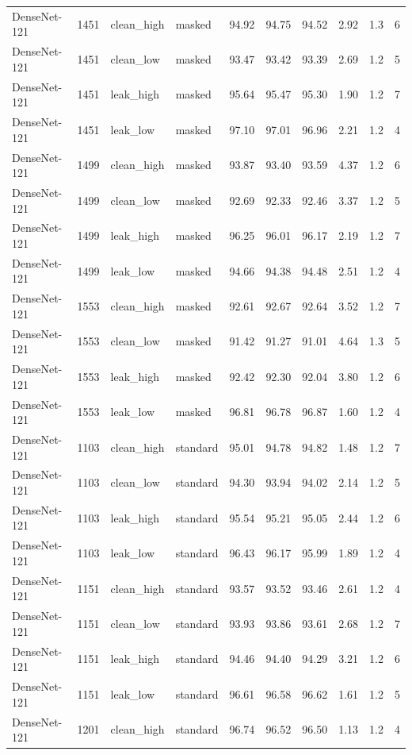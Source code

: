 {\begin{longtable}{lrllrrrrrr}
DenseNet-121 & 1451 & clean\_high & masked & 94.92 & 94.75 & 94.52 & 2.92 & 1.3 & 6 \\
DenseNet-121 & 1451 & clean\_low & masked & 93.47 & 93.42 & 93.39 & 2.69 & 1.2 & 5 \\
DenseNet-121 & 1451 & leak\_high & masked & 95.64 & 95.47 & 95.30 & 1.90 & 1.2 & 7 \\
DenseNet-121 & 1451 & leak\_low & masked & 97.10 & 97.01 & 96.96 & 2.21 & 1.2 & 4 \\
DenseNet-121 & 1499 & clean\_high & masked & 93.87 & 93.40 & 93.59 & 4.37 & 1.2 & 6 \\
DenseNet-121 & 1499 & clean\_low & masked & 92.69 & 92.33 & 92.46 & 3.37 & 1.2 & 5 \\
DenseNet-121 & 1499 & leak\_high & masked & 96.25 & 96.01 & 96.17 & 2.19 & 1.2 & 7 \\
DenseNet-121 & 1499 & leak\_low & masked & 94.66 & 94.38 & 94.48 & 2.51 & 1.2 & 4 \\
DenseNet-121 & 1553 & clean\_high & masked & 92.61 & 92.67 & 92.64 & 3.52 & 1.2 & 7 \\
DenseNet-121 & 1553 & clean\_low & masked & 91.42 & 91.27 & 91.01 & 4.64 & 1.3 & 5 \\
DenseNet-121 & 1553 & leak\_high & masked & 92.42 & 92.30 & 92.04 & 3.80 & 1.2 & 6 \\
DenseNet-121 & 1553 & leak\_low & masked & 96.81 & 96.78 & 96.87 & 1.60 & 1.2 & 4 \\
DenseNet-121 & 1103 & clean\_high & standard & 95.01 & 94.78 & 94.82 & 1.48 & 1.2 & 7 \\
DenseNet-121 & 1103 & clean\_low & standard & 94.30 & 93.94 & 94.02 & 2.14 & 1.2 & 5 \\
DenseNet-121 & 1103 & leak\_high & standard & 95.54 & 95.21 & 95.05 & 2.44 & 1.2 & 6 \\
DenseNet-121 & 1103 & leak\_low & standard & 96.43 & 96.17 & 95.99 & 1.89 & 1.2 & 4 \\
DenseNet-121 & 1151 & clean\_high & standard & 93.57 & 93.52 & 93.46 & 2.61 & 1.2 & 4 \\
DenseNet-121 & 1151 & clean\_low & standard & 93.93 & 93.86 & 93.61 & 2.68 & 1.2 & 7 \\
DenseNet-121 & 1151 & leak\_high & standard & 94.46 & 94.40 & 94.29 & 3.21 & 1.2 & 6 \\
DenseNet-121 & 1151 & leak\_low & standard & 96.61 & 96.58 & 96.62 & 1.61 & 1.2 & 5 \\
DenseNet-121 & 1201 & clean\_high & standard & 96.74 & 96.52 & 96.50 & 1.13 & 1.2 & 4 \\

\end{longtable}}
